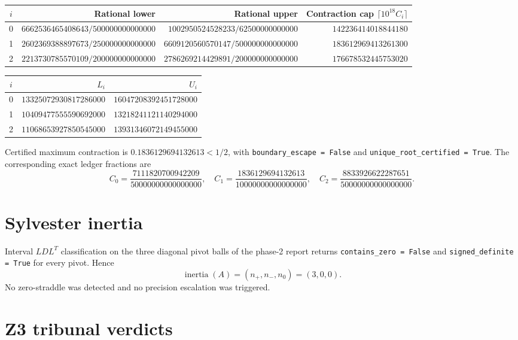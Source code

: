 \documentclass[11pt]{article}
\newcommand{\code}[1]{\texttt{#1}}
\begin{document}
\begin{center}
\begin{tabular}{@{}crrr@{}}
\toprule
$i$ & Rational lower & Rational upper & Contraction cap $\lceil 10^{18} C_i \rceil$ \\
\midrule
0 & $6662536465408643/500000000000000$ & $1002950524528233/62500000000000$ & $142236414018844180$ \\
1 & $2602369388897673/250000000000000$ & $6609120560570147/500000000000000$ & $183612969413261300$ \\
2 & $2213730785570109/200000000000000$ & $2786269214429891/200000000000000$ & $176678532445753020$ \\
\bottomrule
\end{tabular}
\end{center}

\begin{center}
\begin{tabular}{@{}crr@{}}
\toprule
$i$ & $L_i$ & $U_i$ \\
\midrule
0 & $13325072930817286000$ & $16047208392451728000$ \\
1 & $10409477555590692000$ & $13218241121140294000$ \\
2 & $11068653927850545000$ & $13931346072149455000$ \\
\bottomrule
\end{tabular}
\end{center}

Certified maximum contraction is $0.1836129694132613 < 1/2$, with \code{boundary\_escape = False} and \code{unique\_root\_certified = True}. The corresponding exact ledger fractions are
\[
C_0 = \frac{7111820700942209}{50000000000000000},\quad
C_1 = \frac{1836129694132613}{10000000000000000},\quad
C_2 = \frac{8833926622287651}{50000000000000000}.
\]

\section{Sylvester inertia}

Interval $LDL^{T}$ classification on the three diagonal pivot balls of the phase-2 report returns \code{contains\_zero = False} and \code{signed\_definite = True} for every pivot. Hence
\[
\operatorname{inertia}(A) = (n_+, n_-, n_0) = (3, 0, 0).
\]
No zero-straddle was detected and no precision escalation was triggered.

\section{Z3 tribunal verdicts}
\end{document}
